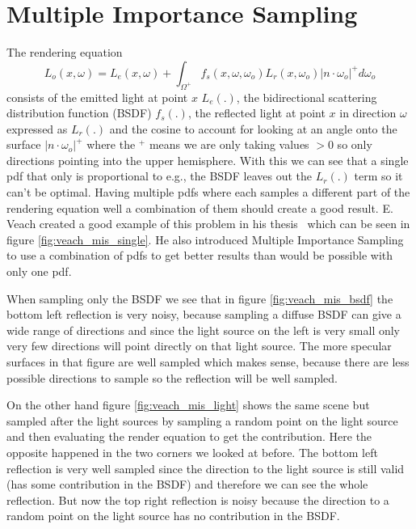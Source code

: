\section{Multiple Importance Sampling}
\label{sec:multiple_importance_sampling}
The rendering equation
\begin{equation}
    \label{eq:rendering_equation}
    L_o(x, \omega) = L_e(x, \omega) + \int_{\Omega^+} f_s(x, \omega, \omega_o) L_r(x, \omega_o) |n \cdot \omega_o|^+ d\omega_o
\end{equation}
consists of the emitted light at point $ x $ $ L_e(.) $,
the bidirectional scattering distribution function (BSDF) $ f_s(.) $,
the reflected light at point $ x $ in direction $ \omega $ expressed as $ L_r(.) $
and the cosine to account for looking at an angle onto the surface $ |n \cdot \omega_o|^+ $
where the $ ^+ $ means we are only taking values $ > 0 $ so only directions pointing into the upper hemisphere.
With this we can see that a single pdf that only is proportional to e.g., the BSDF leaves out the $ L_r(.) $ term so it can't be optimal.
Having multiple pdfs where each samples a different part of the rendering equation well
a combination of them should create a good result.
E. Veach created a good example of this problem in his thesis~\cite{veach-thesis} which can be seen in figure \ref{fig:veach_mis_single}.
He also introduced Multiple Importance Sampling to use a combination of pdfs to get better results than would be possible with only one pdf.

When sampling only the BSDF we see that in figure \ref{fig:veach_mis_bsdf} the bottom left reflection is very noisy,
because sampling a diffuse BSDF can give a wide range of directions
and since the light source on the left is very small only very few directions will point directly on that light source.
The more specular surfaces in that figure are well sampled which makes sense,
because there are less possible directions to sample so the reflection will be well sampled.

On the other hand figure \ref{fig:veach_mis_light} shows the same scene but sampled after the light sources
by sampling a random point on the light source and then evaluating the render equation to get the contribution.
Here the opposite happened in the two corners we looked at before.
The bottom left reflection is very well sampled
since the direction to the light source is still valid (has some contribution in the BSDF) and therefore we can see the whole reflection.
But now the top right reflection is noisy because the direction to a random point on the light source has no contribution in the BSDF.

